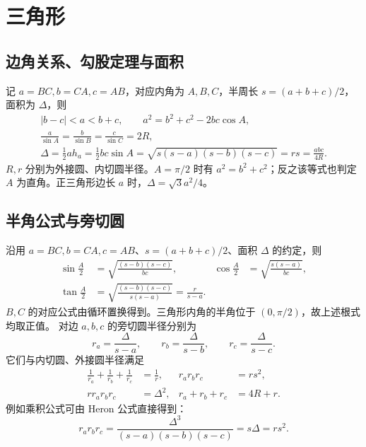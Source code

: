 \documentclass[../main.tex]{subfiles}
\begin{document}
\section{三角形}
\subsection{边角关系、勾股定理与面积}
记 $a=BC,b=CA,c=AB$，对应内角为 $A,B,C$，半周长 $s=(a+b+c)/2$，面积为 $\Delta$，则
\begin{gather*}
|b-c|<a<b+c,\qquad a^2=b^2+c^2-2bc\cos A,\\
\frac a{\sin A}=\frac b{\sin B}=\frac c{\sin C}=2R,\\
\Delta=\frac12ah_a=\frac12bc\sin A
=\sqrt{s(s-a)(s-b)(s-c)}=rs=\frac{abc}{4R}.
\end{gather*}
$R,r$ 分别为外接圆、内切圆半径。$A=\pi/2$ 时有 $a^2=b^2+c^2$；反之该等式也判定 $A$ 为直角。正三角形边长 $a$ 时，$\Delta=\sqrt3a^2/4$。
\subsection{半角公式与旁切圆}
沿用 $a=BC,b=CA,c=AB$、$s=(a+b+c)/2$、面积 $\Delta$ 的约定，则
\begin{align*}
\sin\frac A2&=\sqrt{\frac{(s-b)(s-c)}{bc}}, &
\cos\frac A2&=\sqrt{\frac{s(s-a)}{bc}},\\
\tan\frac A2&=\sqrt{\frac{(s-b)(s-c)}{s(s-a)}}=\frac r{s-a}.
\end{align*}
$B,C$ 的对应公式由循环置换得到。三角形内角的半角位于 $(0,\pi/2)$，故上述根式均取正值。
对边 $a,b,c$ 的旁切圆半径分别为
\[
r_a=\frac\Delta{s-a},\qquad r_b=\frac\Delta{s-b},\qquad
r_c=\frac\Delta{s-c}.
\]
它们与内切圆、外接圆半径满足
\begin{align*}
\frac1{r_a}+\frac1{r_b}+\frac1{r_c}&=\frac1r, &
r_ar_br_c&=rs^2,\\
rr_ar_br_c&=\Delta^2, & r_a+r_b+r_c&=4R+r.
\end{align*}
例如乘积公式可由 Heron 公式直接得到：
\[
r_ar_br_c=\frac{\Delta^3}{(s-a)(s-b)(s-c)}=s\Delta=rs^2.
\]
\end{document}
